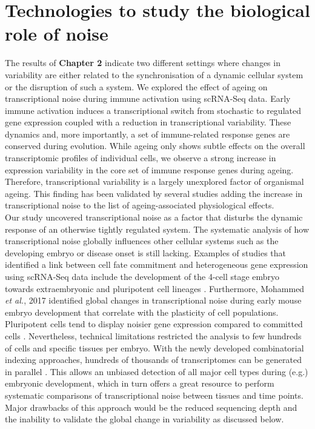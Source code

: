 \newpage

\section{Technologies to study the biological role of noise}

The results of \textbf{Chapter 2} indicate two different settings where changes in variability are either related to the synchronisation of a dynamic cellular system or the disruption of such a system. 
We explored the effect of ageing on transcriptional noise during immune activation using scRNA-Seq data. 
Early immune activation induces a transcriptional switch from stochastic to regulated gene expression coupled with a reduction in transcriptional variability. 
These dynamics and, more importantly, a set of immune-related response genes are conserved during evolution. 
While ageing only shows subtle effects on the overall transcriptomic profiles of individual cells, we observe a strong increase in expression variability in the core set of immune response genes during ageing. 
Therefore, transcriptional variability is a largely unexplored factor of organismal ageing. 
This finding has been validated by several studies \citep{Enge2017, Angelidis2018, Cheung2018} adding the increase in transcriptional noise to the list of ageing-associated physiological effects.\\

Our study uncovered transcriptional noise as a factor that disturbs the dynamic response of an otherwise tightly regulated system. 
The systematic analysis of how transcriptional noise globally influences other cellular systems such as the developing embryo or disease onset is still lacking. 
Examples of studies that identified a link between cell fate commitment and heterogeneous gene expression using scRNA-Seq data include the development of the 4-cell stage embryo towards extraembryonic and pluripotent cell lineages \citep{Goolam2016}. 
Furthermore, Mohammed \emph{et al.}, 2017 identified global changes in transcriptional noise during early mouse embryo development that correlate with the plasticity of cell populations. 
Pluripotent cells tend to display noisier gene expression compared to committed cells \citep{Mohammed2017}. 
Nevertheless, technical limitations restricted the analysis to few hundreds of cells and specific tissues per embryo. 
With the newly developed combinatorial indexing approaches, hundreds of thousands of transcriptomes can be generated in parallel \citep{Cao2017}. 
This allows an unbiased detection of all major cell types during (e.g.) embryonic development, which in turn offers a great resource to perform systematic comparisons of transcriptional noise between tissues and time points. 
Major drawbacks of this approach would be the reduced sequencing depth and the inability to validate the global change in variability as discussed below.\\

